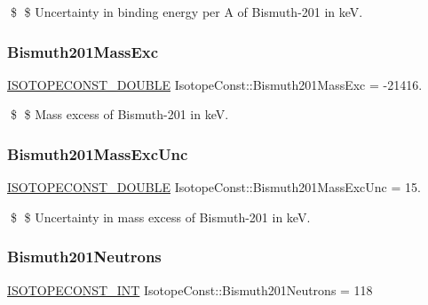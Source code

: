 \$ \$ Uncertainty in binding energy per A of Bismuth-\/201 in keV. \mbox{\label{group___isotope_const-_bismuth-_bi201_ga3e7786e6869c7cffd8593a40972770bf}} 
\subsubsection{\texorpdfstring{Bismuth201\+Mass\+Exc}{Bismuth201MassExc}}
{\footnotesize\ttfamily \mbox{\hyperlink{group___isotope_const-_macros_ga8f45a7272ce02c0b4c65c44636ed719a}{I\+S\+O\+T\+O\+P\+E\+C\+O\+N\+S\+T\+\_\+\+D\+O\+U\+B\+LE}} Isotope\+Const\+::\+Bismuth201\+Mass\+Exc = -\/21416.}

\$ \$ Mass excess of Bismuth-\/201 in keV. \mbox{\label{group___isotope_const-_bismuth-_bi201_gac57401a15533233cfdbdc5347ec865dd}} 
\subsubsection{\texorpdfstring{Bismuth201\+Mass\+Exc\+Unc}{Bismuth201MassExcUnc}}
{\footnotesize\ttfamily \mbox{\hyperlink{group___isotope_const-_macros_ga8f45a7272ce02c0b4c65c44636ed719a}{I\+S\+O\+T\+O\+P\+E\+C\+O\+N\+S\+T\+\_\+\+D\+O\+U\+B\+LE}} Isotope\+Const\+::\+Bismuth201\+Mass\+Exc\+Unc = 15.}

\$ \$ Uncertainty in mass excess of Bismuth-\/201 in keV. \mbox{\label{group___isotope_const-_bismuth-_bi201_ga2077a6b69a87870c0e15765c8cadd78f}} 
\subsubsection{\texorpdfstring{Bismuth201\+Neutrons}{Bismuth201Neutrons}}
{\footnotesize\ttfamily \mbox{\hyperlink{group___isotope_const-_macros_ga5f18360b3e99483a35c32d789e62621c}{I\+S\+O\+T\+O\+P\+E\+C\+O\+N\+S\+T\+\_\+\+I\+NT}} Isotope\+Const\+::\+Bismuth201\+Neutrons = 118}

